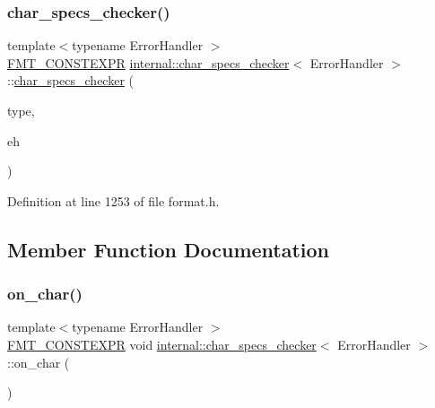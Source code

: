 \subsubsection{\texorpdfstring{char\+\_\+specs\+\_\+checker()}{char\_specs\_checker()}}
{\footnotesize\ttfamily template$<$typename Error\+Handler $>$ \\
\hyperlink{core_8h_a69201cb276383873487bf68b4ef8b4cd}{F\+M\+T\+\_\+\+C\+O\+N\+S\+T\+E\+X\+PR} \hyperlink{classinternal_1_1char__specs__checker}{internal\+::char\+\_\+specs\+\_\+checker}$<$ Error\+Handler $>$\+::\hyperlink{classinternal_1_1char__specs__checker}{char\+\_\+specs\+\_\+checker} (\begin{DoxyParamCaption}\item[{char}]{type,  }\item[{Error\+Handler}]{eh }\end{DoxyParamCaption})\hspace{0.3cm}{\ttfamily [inline]}}



Definition at line 1253 of file format.\+h.



\subsection{Member Function Documentation}
\mbox{\label{classinternal_1_1char__specs__checker_a332bcf72661fd9a020834a5b17d352e8}} 
\subsubsection{\texorpdfstring{on\+\_\+char()}{on\_char()}}
{\footnotesize\ttfamily template$<$typename Error\+Handler $>$ \\
\hyperlink{core_8h_a69201cb276383873487bf68b4ef8b4cd}{F\+M\+T\+\_\+\+C\+O\+N\+S\+T\+E\+X\+PR} void \hyperlink{classinternal_1_1char__specs__checker}{internal\+::char\+\_\+specs\+\_\+checker}$<$ Error\+Handler $>$\+::on\+\_\+char (\begin{DoxyParamCaption}{ }\end{DoxyParamCaption})\hspace{0.3cm}{\ttfamily [inline]}}



